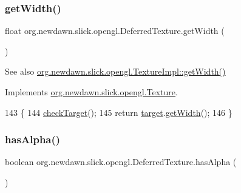 \subsubsection{\texorpdfstring{get\+Width()}{getWidth()}}
{\footnotesize\ttfamily float org.\+newdawn.\+slick.\+opengl.\+Deferred\+Texture.\+get\+Width (\begin{DoxyParamCaption}{ }\end{DoxyParamCaption})\hspace{0.3cm}{\ttfamily [inline]}}

\begin{DoxySeeAlso}{See also}
\mbox{\hyperlink{classorg_1_1newdawn_1_1slick_1_1opengl_1_1_texture_impl_afd6ce11ac31f73cd143d6f609a4358f4}{org.\+newdawn.\+slick.\+opengl.\+Texture\+Impl\+::get\+Width()}} 
\end{DoxySeeAlso}


Implements \mbox{\hyperlink{interfaceorg_1_1newdawn_1_1slick_1_1opengl_1_1_texture_a9a4e474e98451e2fe3cf5bedc8fc5910}{org.\+newdawn.\+slick.\+opengl.\+Texture}}.


\begin{DoxyCode}
143                             \{
144         \mbox{\hyperlink{classorg_1_1newdawn_1_1slick_1_1opengl_1_1_deferred_texture_a22f14bcd9cbd4bf033e2308b90464dce}{checkTarget}}();
145         \textcolor{keywordflow}{return} \mbox{\hyperlink{classorg_1_1newdawn_1_1slick_1_1opengl_1_1_deferred_texture_aa70a4b195d0b965a0099d0e7bc18d9d2}{target}}.\mbox{\hyperlink{classorg_1_1newdawn_1_1slick_1_1opengl_1_1_texture_impl_afd6ce11ac31f73cd143d6f609a4358f4}{getWidth}}();
146     \}
\end{DoxyCode}
\mbox{\label{classorg_1_1newdawn_1_1slick_1_1opengl_1_1_deferred_texture_ab371ddf8921fb982ff180b8dcb395688}} 
\subsubsection{\texorpdfstring{has\+Alpha()}{hasAlpha()}}
{\footnotesize\ttfamily boolean org.\+newdawn.\+slick.\+opengl.\+Deferred\+Texture.\+has\+Alpha (\begin{DoxyParamCaption}{ }\end{DoxyParamCaption})\hspace{0.3cm}{\ttfamily [inline]}}

